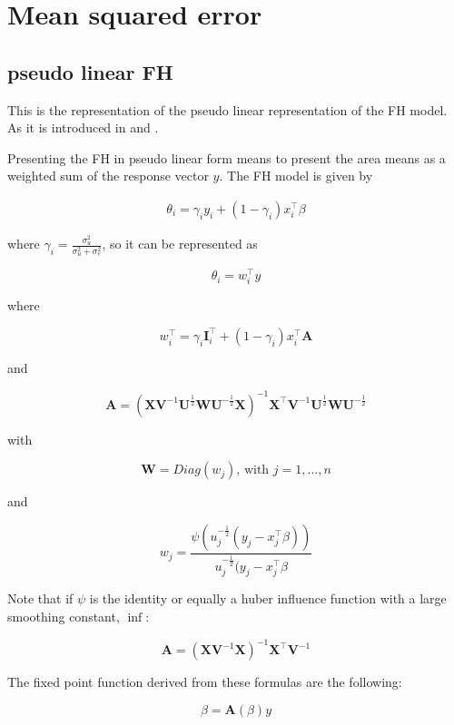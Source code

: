 \section{Mean squared error}\label{mean-squared-error}

\subsection{pseudo linear FH}\label{pseudo-linear-fh}

This is the representation of the pseudo linear representation of the FH
model. As it is introduced in \textcite{Cha11} and \textcite{Cha14}.

Presenting the FH in pseudo linear form means to present the area means
as a weighted sum of the response vector $y$. The FH model is given by

\begin{align}
\theta_i = \gamma_i y_i + (1 - \gamma_i) x_i^\top \beta 
\end{align}

where $\gamma_i = \frac{\sigma^2_u}{\sigma^2_u + \sigma^2_e}$, so it can
be represented as

\[
\theta_i = w_i^\top y
\]

where

\[
w_i^\top = \gamma_i \mathbf{I}^\top_i + (1 - \gamma_i) x_i^\top \mathbf{A}
\]

and

\[
\mathbf{A} = \left(\mathbf{X} \mathbf{V}^{-1} \mathbf{U}^\frac{1}{2} \mathbf{W} \mathbf{U}^{-\frac{1}{2}} \mathbf{X} \right)^{-1} \mathbf{X}^\top \mathbf{V}^{-1} \mathbf{U}^\frac{1}{2} \mathbf{W} \mathbf{U}^{-\frac{1}{2}}
\]

with

\[
\mathbf{W} = Diag(w_j)\text{, with } j = 1, \dots, n
\]

and

\[
w_j = \frac{\psi\left( u_j^{-\frac{1}{2}} ( y_j - x_j^\top\beta ) \right)}{ u_j^{-\frac{1}{2}} ( y_j - x_j^\top\beta }
\]

Note that if $\psi$ is the identity or equally a huber influence
function with a large smoothing constant, \ie $\inf$:

\[
\mathbf{A} = \left(\mathbf{X} \mathbf{V}^{-1} \mathbf{X} \right)^{-1} \mathbf{X}^\top \mathbf{V}^{-1}
\]

The fixed point function derived from these formulas are the following:

\[
\beta = \mathbf{A}(\beta) y
\]

